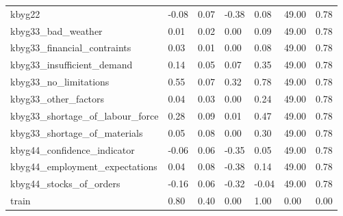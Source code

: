 \begin{landscape}
\begin{longtable}[h!]{lllllll}
kbyg22 & -0.08 & 0.07 & -0.38 & 0.08 & 49.00 & 0.78 \\
kbyg33_bad_weather & 0.01 & 0.02 & 0.00 & 0.09 & 49.00 & 0.78 \\
kbyg33_financial_contraints & 0.03 & 0.01 & 0.00 & 0.08 & 49.00 & 0.78 \\
kbyg33_insufficient_demand & 0.14 & 0.05 & 0.07 & 0.35 & 49.00 & 0.78 \\
kbyg33_no_limitations & 0.55 & 0.07 & 0.32 & 0.78 & 49.00 & 0.78 \\
kbyg33_other_factors & 0.04 & 0.03 & 0.00 & 0.24 & 49.00 & 0.78 \\
kbyg33_shortage_of_labour_force & 0.28 & 0.09 & 0.01 & 0.47 & 49.00 & 0.78 \\
kbyg33_shortage_of_materials & 0.05 & 0.08 & 0.00 & 0.30 & 49.00 & 0.78 \\
kbyg44_confidence_indicator & -0.06 & 0.06 & -0.35 & 0.05 & 49.00 & 0.78 \\
kbyg44_employment_expectations & 0.04 & 0.08 & -0.38 & 0.14 & 49.00 & 0.78 \\
kbyg44_stocks_of_orders & -0.16 & 0.06 & -0.32 & -0.04 & 49.00 & 0.78 \\
train & 0.80 & 0.40 & 0.00 & 1.00 & 0.00 & 0.00 \\
\end{longtable}\end{landscape}
